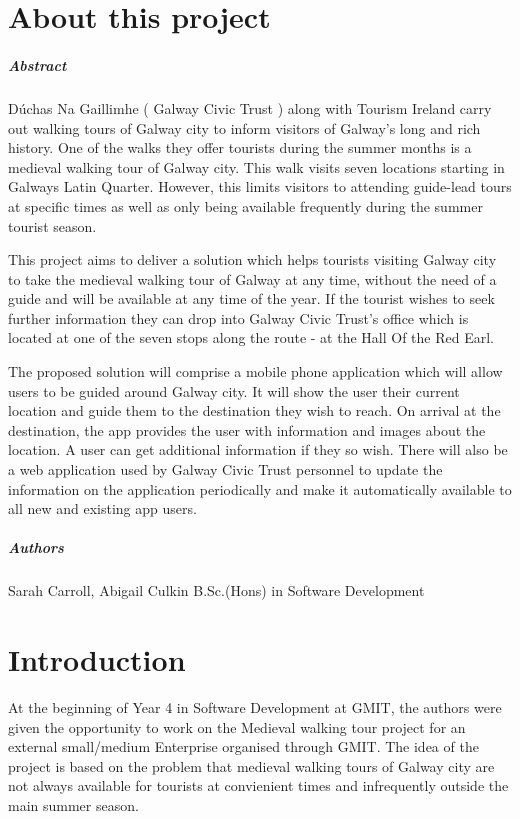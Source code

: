 
\chapter*{About this project}
\paragraph{Abstract}

Dúchas Na Gaillimhe ( Galway Civic Trust ) along with Tourism Ireland carry out walking tours of Galway city to inform visitors of Galway's long and rich history. One of the walks they offer tourists during the summer months is a medieval walking tour of Galway city. This walk visits seven locations starting in Galways Latin Quarter. However, this limits visitors to attending guide-lead tours at specific times as well as only being available frequently during the summer tourist season.

This project aims to deliver a solution which helps tourists visiting Galway city to take the medieval walking tour of Galway at any time, without the need of a guide and will be available at any time of the year. If the tourist wishes to seek further information they can drop into Galway Civic Trust's office which is located at one of the seven stops along the route - at the Hall Of the Red Earl.

The proposed solution will comprise a mobile phone application which will allow users to be guided around Galway city. It will show the user their current location and guide them to the destination they wish to reach. On arrival at the destination, the app provides the user with information and images about the location. A user can get additional information if they so wish. There will also be a web application used by Galway Civic Trust personnel to update the information on the application periodically and make it automatically available to all new and existing app users.

\paragraph{Authors}
Sarah Carroll, Abigail Culkin
B.Sc.(Hons) in Software Development

\chapter{Introduction}

At the beginning of Year 4 in Software Development at GMIT, the authors were given the opportunity to work on the Medieval walking tour project for an external small/medium Enterprise organised through GMIT. The idea of the project is based on the problem that medieval walking tours of Galway city are not always available for tourists at convienient times and infrequently outside the main summer season. 


